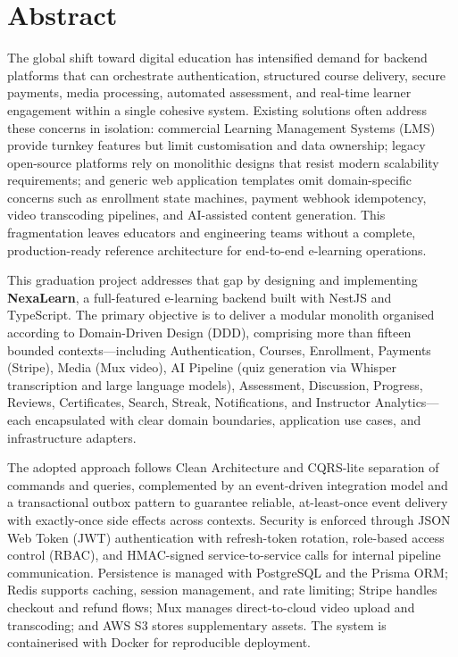 
\chapter*{Abstract}

The global shift toward digital education has intensified demand for backend platforms that can orchestrate authentication, structured course delivery, secure payments, media processing, automated assessment, and real-time learner engagement within a single cohesive system. Existing solutions often address these concerns in isolation: commercial Learning Management Systems (LMS) provide turnkey features but limit customisation and data ownership; legacy open-source platforms rely on monolithic designs that resist modern scalability requirements; and generic web application templates omit domain-specific concerns such as enrollment state machines, payment webhook idempotency, video transcoding pipelines, and AI-assisted content generation. This fragmentation leaves educators and engineering teams without a complete, production-ready reference architecture for end-to-end e-learning operations.

This graduation project addresses that gap by designing and implementing \textbf{NexaLearn}, a full-featured e-learning backend built with NestJS and TypeScript. The primary objective is to deliver a modular monolith organised according to Domain-Driven Design (DDD), comprising more than fifteen bounded contexts---including Authentication, Courses, Enrollment, Payments (Stripe), Media (Mux video), AI Pipeline (quiz generation via Whisper transcription and large language models), Assessment, Discussion, Progress, Reviews, Certificates, Search, Streak, Notifications, and Instructor Analytics---each encapsulated with clear domain boundaries, application use cases, and infrastructure adapters.

The adopted approach follows Clean Architecture and CQRS-lite separation of commands and queries, complemented by an event-driven integration model and a transactional outbox pattern to guarantee reliable, at-least-once event delivery with exactly-once side effects across contexts. Security is enforced through JSON Web Token (JWT) authentication with refresh-token rotation, role-based access control (RBAC), and HMAC-signed service-to-service calls for internal pipeline communication. Persistence is managed with PostgreSQL and the Prisma ORM; Redis supports caching, session management, and rate limiting; Stripe handles checkout and refund flows; Mux manages direct-to-cloud video upload and transcoding; and AWS S3 stores supplementary assets. The system is containerised with Docker for reproducible deployment.

